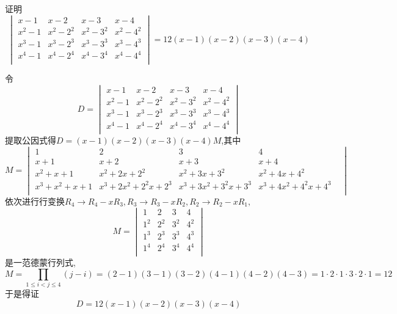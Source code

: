 \begin{questions}
    \question 证明
        \[
        \begin{vmatrix}
        x-1 & x-2 & x-3 & x-4 \\
        x^2 - 1 & x^2 - 2^2 & x^2 - 3^2 & x^2 - 4^2 \\
        x^3 - 1 & x^3 - 2^3 & x^3 - 3^3 & x^3 - 4^3 \\
        x^4 - 1 & x^4 - 2^4 & x^4 - 3^4 & x^4 - 4^4 \\
        \end{vmatrix}
        =12(x - 1)(x - 2)(x - 3)(x - 4)
        \]
    \begin{solution}
        令
        \[
        D=\begin{vmatrix}
        x-1 & x-2 & x-3 & x-4 \\
        x^2 - 1 & x^2 - 2^2 & x^2 - 3^2 & x^2 - 4^2 \\
        x^3 - 1 & x^3 - 2^3 & x^3 - 3^3 & x^3 - 4^3 \\
        x^4 - 1 & x^4 - 2^4 & x^4 - 3^4 & x^4 - 4^4 \\
        \end{vmatrix}        
        \]
        提取公因式得$D=(x - 1)(x - 2)(x - 3)(x - 4)M$,其中
        \[
        M=
        \begin{vmatrix}
        1 & 2 & 3 & 4 \\
        x+1 & x+2 & x+3 & x+4 & \\
        x^2+x+1 & x^2+2x+2^2 & x^2+3x+3^2 & x^2+4x+4^2 & \\
        x^3+x^2+x+1 & x^3+2x^2+2^2x+2^3 & x^3+3x^2+3^2x+3^3 & x^3+4x^2+4^2x+4^3 & \\
        \end{vmatrix}        
        \]
        依次进行行变换$R_4 \rightarrow R_4-xR_3,R_3 \rightarrow R_3-xR_2,R_2 \rightarrow R_2-xR_1,$
        \[
        M=
        \begin{vmatrix}
        1 & 2 & 3 & 4 \\
        1^2 & 2^2 & 3^2 & 4^2 \\
        1^3 & 2^3 & 3^3 & 4^3 \\
        1^4 & 2^4 & 3^4 & 4^4 \\
        \end{vmatrix}
        \]
        是一范德蒙行列式,
        \[
        M= \prod_{1\leq i<j\leq4}(j−i)=(2−1)(3-1)(3−2)(4−1)(4−2)(4−3)=1\cdot2\cdot1\cdot3\cdot2\cdot1= 12
        \]
        于是得证
        \[
        D=12(x - 1)(x - 2)(x - 3)(x - 4)
        \]
    \end{solution}


\end{questions}
